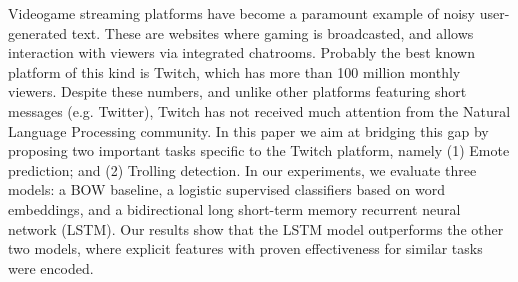 Videogame streaming platforms have become a paramount example of noisy user-generated text. These are websites where gaming is broadcasted, and allows interaction with viewers via integrated chatrooms. Probably the best known platform of this kind is Twitch, which has more than 100 million monthly viewers. Despite these numbers, and unlike other platforms featuring short messages (e.g. Twitter), Twitch has not received much attention from the Natural Language Processing community. In this paper we aim at bridging this gap by proposing two important tasks specific to the Twitch platform, namely (1) Emote prediction; and (2) Trolling detection. In our experiments, we evaluate three models: a BOW baseline, a logistic supervised classifiers based on word embeddings, and a bidirectional long short-term memory recurrent neural network (LSTM). Our results show that the LSTM model outperforms the other two models, where explicit features with proven effectiveness for similar tasks were encoded.
